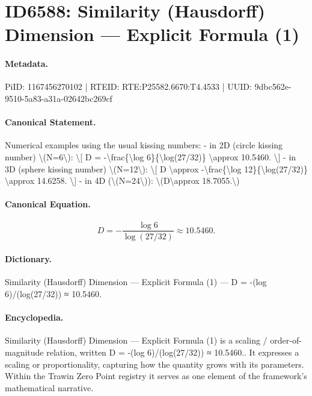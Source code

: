 \section*{ID6588: Similarity (Hausdorff) Dimension — Explicit Formula (1)}
\paragraph{Metadata.}
PiID: 1167456270102 | RTEID: RTE:P25582.6670:T4.4533 | UUID: 9dbc562e-9510-5a83-a31a-02642bc269cf

\paragraph{Canonical Statement.}
Numerical examples using the usual kissing numbers: - in 2D (circle kissing number) \textbackslash{}(N=6\textbackslash{}): \textbackslash{}[ D = -\textbackslash{}frac\{\textbackslash{}log 6\}\{\textbackslash{}log(27/32)\} \textbackslash{}approx 10.5460. \textbackslash{}] - in 3D (sphere kissing number) \textbackslash{}(N=12\textbackslash{}): \textbackslash{}[ D \textbackslash{}approx -\textbackslash{}frac\{\textbackslash{}log 12\}\{\textbackslash{}log(27/32)\} \textbackslash{}approx 14.6258. \textbackslash{}] - in 4D (\textbackslash{}(N=24\textbackslash{})): \textbackslash{}(D\textbackslash{}approx 18.7055.\textbackslash{})

\paragraph{Canonical Equation.}
\[
D = -\frac{\log 6}{\log(27/32)} \approx 10.5460.
\]

\paragraph{Dictionary.}
Similarity (Hausdorff) Dimension — Explicit Formula (1) — D = -(log 6)/(log(27/32)) ≈ 10.5460.

\paragraph{Encyclopedia.}
Similarity (Hausdorff) Dimension — Explicit Formula (1) is a scaling / order-of-magnitude relation, written D = -(log 6)/(log(27/32)) ≈ 10.5460.. It expresses a scaling or proportionality, capturing how the quantity grows with its parameters. Within the Trawin Zero Point registry it serves as one element of the framework's mathematical narrative.
